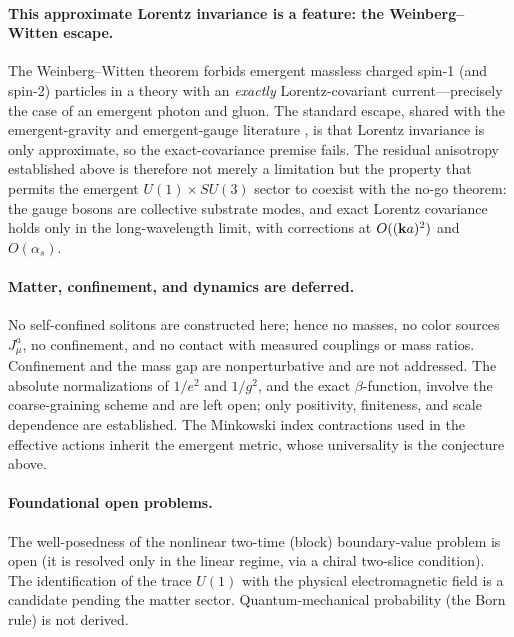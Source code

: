 \paragraph{This approximate Lorentz invariance is a feature: the Weinberg--Witten escape.}
The Weinberg--Witten theorem \citep{WeinbergWitten1980} forbids emergent massless charged spin-1
(and spin-2) particles in a theory with an \emph{exactly} Lorentz-covariant current---precisely
the case of an emergent photon and gluon. The standard escape, shared with the emergent-gravity
and emergent-gauge literature \citep{Volovik2003,Wen2004}, is that Lorentz invariance is only
approximate, so the exact-covariance premise fails. The residual anisotropy established above is
therefore not merely a limitation but the property that permits the emergent $U(1)\times SU(3)$
sector to coexist with the no-go theorem: the gauge bosons are collective substrate modes, and
exact Lorentz covariance holds only in the long-wavelength limit, with corrections at
$O((\mathbf{k} a)^2)$ and $O(\alpha_s)$.

\paragraph{Matter, confinement, and dynamics are deferred.} No self-confined solitons are
constructed here; hence no masses, no color sources $J^a_\mu$, no confinement, and no contact
with measured couplings or mass ratios. Confinement and the mass gap are nonperturbative and are
not addressed. The absolute normalizations of $1/e^2$ and $1/g^2$, and the exact
$\beta$-function, involve the coarse-graining scheme and are left open; only positivity,
finiteness, and scale dependence are established. The Minkowski index contractions used in the
effective actions inherit the emergent metric, whose universality is the conjecture above.

\paragraph{Foundational open problems.} The well-posedness of the nonlinear two-time (block)
boundary-value problem is open (it is resolved only in the linear regime, via a chiral two-slice
condition). The identification of the trace $U(1)$ with the physical electromagnetic field is a
candidate pending the matter sector. Quantum-mechanical probability (the Born rule) is not derived.
